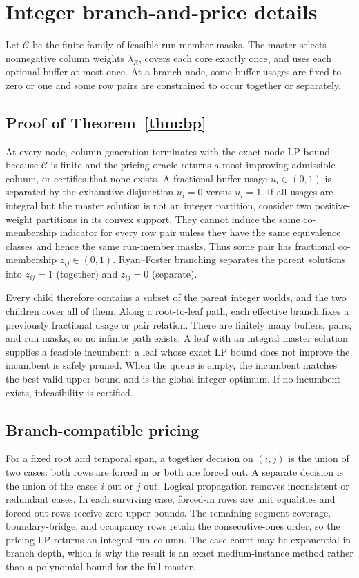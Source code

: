 \section{Integer branch-and-price details}
\label{app:integer-bp}

Let $\mathcal C$ be the finite family of feasible run-member masks.  The master
selects nonnegative column weights $\lambda_R$, covers each core exactly once,
and uses each optional buffer at most once.  At a branch node, some buffer
usages are fixed to zero or one and some row pairs are constrained to occur
together or separately.

\subsection{Proof of Theorem~\ref{thm:bp}}

At every node, column generation terminates with the exact node LP bound because
$\mathcal C$ is finite and the pricing oracle returns a most improving
admissible column, or certifies that none exists.  A fractional buffer usage
$u_i\in(0,1)$ is separated by the exhaustive disjunction $u_i=0$ versus
$u_i=1$.  If all usages are integral but the master solution is not an integer
partition, consider two positive-weight partitions in its convex support.  They
cannot induce the same co-membership indicator for every row pair unless they
have the same equivalence classes and hence the same run-member masks.  Thus
some pair has fractional co-membership $z_{ij}\in(0,1)$.  Ryan--Foster
branching separates the parent solutions into $z_{ij}=1$ (together) and
$z_{ij}=0$ (separate).

Every child therefore contains a subset of the parent integer worlds, and the
two children cover all of them.  Along a root-to-leaf path, each effective
branch fixes a previously fractional usage or pair relation.  There are
finitely many buffers, pairs, and run masks, so no infinite path exists.  A
leaf with an integral master solution supplies a feasible incumbent; a leaf
whose exact LP bound does not improve the incumbent is safely pruned.  When the
queue is empty, the incumbent matches the best valid upper bound and is the
global integer optimum.  If no incumbent exists, infeasibility is certified.

\subsection{Branch-compatible pricing}

For a fixed root and temporal span, a together decision on $(i,j)$ is the union
of two cases: both rows are forced in or both are forced out.  A separate
decision is the union of the cases $i$ out or $j$ out.  Logical propagation
removes inconsistent or redundant cases.  In each surviving case, forced-in
rows are unit equalities and forced-out rows receive zero upper bounds.  The
remaining segment-coverage, boundary-bridge, and occupancy rows retain the
consecutive-ones order, so the pricing LP returns an integral run column.
The case count may be exponential in branch depth, which is why the result is
an exact medium-instance method rather than a polynomial bound for the full
master.

